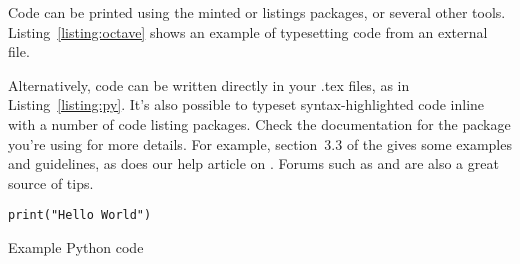 Code can be printed using the minted or listings packages, or several other tools.
Listing~\ref{listing:octave} shows an example of typesetting code from an external file.


Alternatively, code can be written directly in your .tex files, as in Listing~\ref{listing:py}.
It's also possible to typeset syntax-highlighted code inline with a number of code listing packages.
Check the documentation for the package you're using for more details.
For example, section~3.3 of the  gives some examples and guidelines, as does our help article on . Forums such as  and  are also a great source of tips.

\begin{listing}
\begin{verbatim}
print("Hello World")
\end{verbatim}
\caption{Example Python code}
\label{listing:py}
\end{listing}